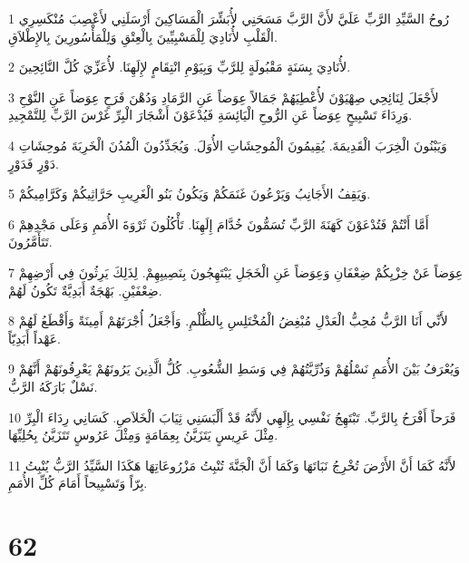 \par 1 رُوحُ السَّيِّدِ الرَّبِّ عَلَيَّ لأَنَّ الرَّبَّ مَسَحَنِي لأُبَشِّرَ الْمَسَاكِينَ أَرْسَلَنِي لأَعْصِبَ مُنْكَسِرِي الْقَلْبِ لأُنَادِيَ لِلْمَسْبِيِّينَ بِالْعِتْقِ وَلِلْمَأْسُورِينَ بِالإِطْلاَقِ.
\par 2 لأُنَادِيَ بِسَنَةٍ مَقْبُولَةٍ لِلرَّبِّ وَبِيَوْمِ انْتِقَامٍ لإِلَهِنَا. لأُعَزِّيَ كُلَّ النَّائِحِينَ.
\par 3 لأَجْعَلَ لِنَائِحِي صِهْيَوْنَ لأُعْطِيَهُمْ جَمَالاً عِوَضاً عَنِ الرَّمَادِ وَدُهْنَ فَرَحٍ عِوَضاً عَنِ النَّوْحِ وَرِدَاءَ تَسْبِيحٍ عِوَضاً عَنِ الرُّوحِ الْيَائِسَةِ فَيُدْعَوْنَ أَشْجَارَ الْبِرِّ غَرْسَ الرَّبِّ لِلتَّمْجِيدِ.
\par 4 وَيَبْنُونَ الْخِرَبَ الْقَدِيمَةَ. يُقِيمُونَ الْمُوحِشَاتِ الأُوَلَ. وَيُجَدِّدُونَ الْمُدُنَ الْخَرِبَةَ مُوحِشَاتِ دَوْرٍ فَدَوْرٍ.
\par 5 وَيَقِفُ الأَجَانِبُ وَيَرْعُونَ غَنَمَكُمْ وَيَكُونُ بَنُو الْغَرِيبِ حَرَّاثِيكُمْ وَكَرَّامِيكُمْ.
\par 6 أَمَّا أَنْتُمْ فَتُدْعَوْنَ كَهَنَةَ الرَّبِّ تُسَمُّونَ خُدَّامَ إِلَهِنَا. تَأْكُلُونَ ثَرْوَةَ الأُمَمِ وَعَلَى مَجْدِهِمْ تَتَأَمَّرُونَ.
\par 7 عِوَضاً عَنْ خِزْيِكُمْ ضِعْفَانِ وَعِوَضاً عَنِ الْخَجَلِ يَبْتَهِجُونَ بِنَصِيبِهِمْ. لِذَلِكَ يَرِثُونَ فِي أَرْضِهِمْ ضِعْفَيْنِ. بَهْجَةٌ أَبَدِيَّةٌ تَكُونُ لَهُمْ.
\par 8 لأَنِّي أَنَا الرَّبُّ مُحِبُّ الْعَدْلِ مُبْغِضُ الْمُخْتَلِسِ بِالظُّلْمِ. وَأَجْعَلُ أُجْرَتَهُمْ أَمِينَةً وَأَقْطَعُ لَهُمْ عَهْداً أَبَدِيّاً.
\par 9 وَيُعْرَفُ بَيْنَ الأُمَمِ نَسْلُهُمْ وَذُرِّيَّتُهُمْ فِي وَسَطِ الشُّعُوبِ. كُلُّ الَّذِينَ يَرُونَهُمْ يَعْرِفُونَهُمْ أَنَّهُمْ نَسْلٌ بَارَكَهُ الرَّبُّ.
\par 10 فَرَحاً أَفْرَحُ بِالرَّبِّ. تَبْتَهِجُ نَفْسِي بِإِلَهِي لأَنَّهُ قَدْ أَلْبَسَنِي ثِيَابَ الْخَلاَصِ. كَسَانِي رِدَاءَ الْبِرِّ مِثْلَ عَرِيسٍ يَتَزَيَّنُ بِعِمَامَةٍ وَمِثْلَ عَرُوسٍ تَتَزَيَّنُ بِحُلِيِّهَا.
\par 11 لأَنَّهُ كَمَا أَنَّ الأَرْضَ تُخْرِجُ نَبَاتَهَا وَكَمَا أَنَّ الْجَنَّةَ تُنْبِتُ مَزْرُوعَاتِهَا هَكَذَا السَّيِّدُ الرَّبُّ يُنْبِتُ بِرّاً وَتَسْبِيحاً أَمَامَ كُلِّ الأُمَمِ.

\chapter{62}

